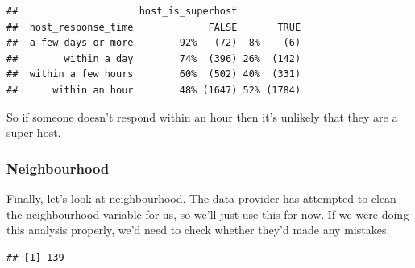 \documentclass[
]{book}
\newenvironment{Shaded}{\begin{snugshade}}{\end{snugshade}}
\newcommand{\CommentTok}[1]{\textcolor[rgb]{0.56,0.35,0.01}{\textit{#1}}}
\newcommand{\DecValTok}[1]{\textcolor[rgb]{0.00,0.00,0.81}{#1}}
\newcommand{\KeywordTok}[1]{\textcolor[rgb]{0.13,0.29,0.53}{\textbf{#1}}}
\newcommand{\NormalTok}[1]{#1}
\newcommand{\OperatorTok}[1]{\textcolor[rgb]{0.81,0.36,0.00}{\textbf{#1}}}
\newcommand{\StringTok}[1]{\textcolor[rgb]{0.31,0.60,0.02}{#1}}
\begin{document}
\begin{verbatim}
##                     host_is_superhost           
##  host_response_time             FALSE       TRUE
##  a few days or more        92%   (72)  8%    (6)
##        within a day        74%  (396) 26%  (142)
##  within a few hours        60%  (502) 40%  (331)
##      within an hour        48% (1647) 52% (1784)
\end{verbatim}

So if someone doesn't respond within an hour then it's unlikely that they are a super host.

\hypertarget{neighbourhood}{%
\subsubsection{Neighbourhood}\label{neighbourhood}}

Finally, let's look at neighbourhood. The data provider has attempted to clean the neighbourhood variable for us, so we'll just use this for now. If we were doing this analysis properly, we'd need to check whether they'd made any mistakes.

\begin{Shaded}
\end{Shaded}

\begin{verbatim}
## [1] 139
\end{verbatim}

\begin{Shaded}
\end{Shaded}
\end{document}
